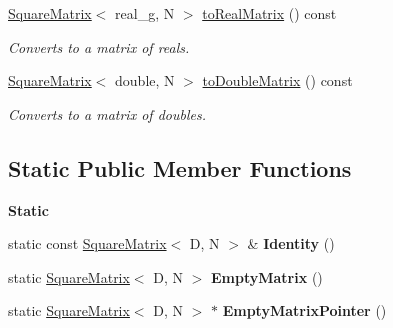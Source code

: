 \begin{Indent}
\begin{DoxyCompactItemize}
\mbox{\label{classrev_1_1_square_matrix_a38f5c267ddfb939b41b6afc1c3ef2dc2}} 
\mbox{\hyperlink{classrev_1_1_square_matrix}{Square\+Matrix}}$<$ real\+\_\+g, N $>$ \mbox{\hyperlink{classrev_1_1_square_matrix_a38f5c267ddfb939b41b6afc1c3ef2dc2}{to\+Real\+Matrix}} () const
\begin{DoxyCompactList}\small\item\em Converts to a matrix of reals. \end{DoxyCompactList}\item 
\mbox{\label{classrev_1_1_square_matrix_a259bae8843f4de7ddd7cb24d7ad850f6}} 
\mbox{\hyperlink{classrev_1_1_square_matrix}{Square\+Matrix}}$<$ double, N $>$ \mbox{\hyperlink{classrev_1_1_square_matrix_a259bae8843f4de7ddd7cb24d7ad850f6}{to\+Double\+Matrix}} () const
\begin{DoxyCompactList}\small\item\em Converts to a matrix of doubles. \end{DoxyCompactList}\end{DoxyCompactItemize}
\end{Indent}
\subsection*{Static Public Member Functions}
\begin{Indent}\textbf{ Static}\par
{\em 
\begin{DoxyItemize}
\item 
\end{DoxyItemize}}\begin{DoxyCompactItemize}
\item 
\mbox{\label{classrev_1_1_square_matrix_a1d665afdda7655bffa0637b6a5d9f0bd}} 
static const \mbox{\hyperlink{classrev_1_1_square_matrix}{Square\+Matrix}}$<$ D, N $>$ \& {\bfseries Identity} ()
\item 
\mbox{\label{classrev_1_1_square_matrix_a287a9264282cc2e69c67f215d8d03d64}} 
static \mbox{\hyperlink{classrev_1_1_square_matrix}{Square\+Matrix}}$<$ D, N $>$ {\bfseries Empty\+Matrix} ()
\item 
\mbox{\label{classrev_1_1_square_matrix_ad1d0c9285f2e5c4b91eef1632cd338a7}} 
static \mbox{\hyperlink{classrev_1_1_square_matrix}{Square\+Matrix}}$<$ D, N $>$ $\ast$ {\bfseries Empty\+Matrix\+Pointer} ()
\end{DoxyCompactItemize}
\end{Indent}
